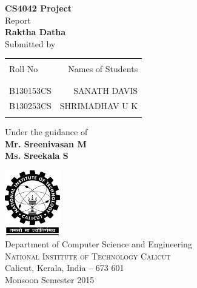 \begin{titlepage}

\begin{center}

\textup{\small {\bf CS4042 Project} \\ Report}\\[0.2in]

\Large \textbf {Raktha Datha}\\[0.5in]



\normalsize Submitted by \\
\begin{table}[h]
\centering
\begin{tabular}{lr}\hline \\
Roll No & Names of Students \\ \\ \hline
\\
B130153CS & SANATH DAVIS \\
B130253CS & SHRIMADHAV U K \\ \\ \hline
\end{tabular}
\end{table}

\vspace{.1in}
Under the guidance of\\
{\textbf{Mr. Sreenivasan M}}\\
{\textbf{Ms. Sreekala S}}\\[0.2in]

\vfill

\includegraphics[width=0.18\textwidth]{./nitc-logo}\\[0.1in]
\Large{Department of Computer Science and Engineering}\\
\normalsize
\textsc{National Institute of Technology Calicut}\\
Calicut, Kerala, India -- 673 601 \\
\vspace{0.2cm}
Monsoon Semester 2015

\end{center}

\end{titlepage}
